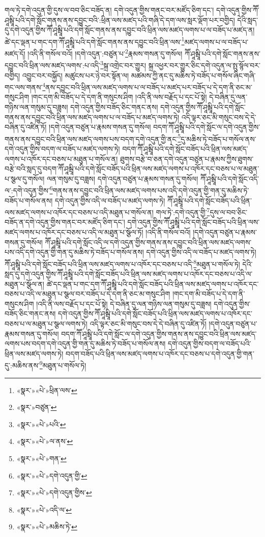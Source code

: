 གལ་ཏེ་དགེ་འདུན་གྱི་དུས་ལ་བབ་ཅིང་བཟོད་ན། དགེ་འདུན་གྱིས་གནང་བར་མཛོད་ཅིག་དང་། དགེ་འདུན་གྱིས་ཀཽ་ཤཱམྦཱི་པའི་དགེ་སློང་གནས་ནས་དབྱུང་བའི་:ཕྲིན་ལས་མཛད་པའི་གཞི་དེ་དག་ལས་སླར་ལྡོག་པར་བགྱིད། དེའི་སླད་དུ་དགེ་འདུན་གྱིས་ཀཽ་ཤཱམྦཱི་པའི་དགེ་སློང་གནས་ནས་དབྱུང་བའི་ཕྲིན་ལས་མཛད་ལགས་པ་ལ་བཟོད་པ་མཛད་ན། ཚེ་དང་ལྡན་པ་གང་དག་ཀཽ་ཤཱམྦཱི་པའི་དགེ་སློང་གནས་ནས་དབྱུང་བའི་ཕྲིན་ལས་\footnote{«སྣར་»«པེ་»ཕྲིན་ལས་}མཛད་ལགས་པ་ལ་བཟོད་པ་མཛད་དོ། །འདི་ནི་གསོལ་བའོ། །དགེ་འདུན་:བཙུན་པ་\footnote{«སྣར་»བཙུན་}རྣམས་གསན་དུ་གསོལ། ཀཽ་ཤཱམྦཱི་པའི་དགེ་སློང་གནས་ནས་དབྱུང་བའི་ཕྲིན་ལས་མཛད་ལགས་:པ་འདི་\footnote{«སྣར་»«པེ་»པའི་}སྐྲ་འགྲེང་བར་གྱུར། སྐྲ་འཕྱར་བར་གྱུར་ཅིང་དགེ་འདུན་ལ་སྤུ་སྙོལ་བར་བགྱིད། འབྱུང་བར་བསྐྱོད། མཚུངས་པར་ཉེ་བར་སྟོན་ལ། མཚམས་ཀྱི་ནང་དུ་མཆིས་ཏེ་བཟོད་པ་གསོལ་ཞིང་གཞི་གང་ལས་གནས་\footnote{«སྣར་»«པེ་»ལ་ནས་}ནས་དབྱུང་བའི་ཕྲིན་ལས་མཛད་ལགས་པ་ལ་བཟོད་པ་མཛད་པར་བཟོད་པ་དེ་དག་ནི་ཅང་མ་གསུང་ཤིག །གང་དག་མི་བཟོད་པ་དེ་དག་ནི་གསུངས་ཤིག །འདི་ནི་ལས་བརྗོད་པ་དང་པོ་སྟེ། དེ་བཞིན་དུ་ལན་གཉིས་ལན་གསུམ་དུ་བཟླས། དགེ་འདུན་གྱིས་བཟོད་ཅིང་གནང་ནས། དགེ་འདུན་གྱིས་ཀཽ་ཤཱམྦཱི་པའི་དགེ་སློང་གནས་ནས་དབྱུང་བའི་ཕྲིན་ལས་མཛད་ལགས་པ་ལ་བཟོད་པ་མཛད་ལགས་ཏེ། འདི་ལྟར་ཅང་མི་གསུང་བས་དེ་དེ་བཞིན་དུ་འཛིན་ཏོ། །དགེ་འདུན་བཙུན་པ་རྣམས་གསན་དུ་གསོལ། བདག་ཀཽ་ཤཱམྦཱི་པའི་དགེ་སློང་ལ་དགེ་འདུན་གྱིས་གནས་ནས་དབྱུང་བའི་ཕྲིན་ལས་མཛད་ལགས་པས་བདག་དགེ་འདུན་གྱི་ནང་\footnote{«སྣར་»«པེ་»གན་}དུ་མཆིས་ཏེ་བཟོད་པ་གསོལ་ནས་དགེ་འདུན་གྱིས་བདག་ལ་བཟོད་པ་མཛད་ལགས་ཏེ། བདག་ཀཽ་ཤཱམྦཱི་པའི་དགེ་སློང་བཟོད་པའི་ཕྲིན་ལས་མཛད་ལགས་པ་འཁོར་དང་བཅས་པ་མཐུན་པ་གསོལ་ན། ཐུགས་བརྩེ་བ་ཅན་དགེ་འདུན་བཙུན་པ་རྣམས་ཀྱིས་ཐུགས་བརྩེ་བའི་སླད་དུ་བདག་ཀཽ་ཤཱམྦཱི་པའི་དགེ་སློང་བཟོད་པའི་ཕྲིན་ལས་མཛད་ལགས་པ་འཁོར་དང་བཅས་པ་ལ་མཐུན་པ་སྩལ་དུ་གསོལ། ལན་གསུམ་དུ་བཟླས། དགེ་འདུན་བཙུན་པ་རྣམས་གསན་དུ་གསོལ། ཀཽ་ཤཱམྦཱི་པའི་དགེ་སློང་འདི་ལ་:དགེ་འདུན་གྱིས་\footnote{«སྣར་»«པེ་»དགེ་འདུན་གྱི་}གནས་ནས་དབྱུང་བའི་ཕྲིན་ལས་མཛད་ལགས་པས་འདི་དགེ་འདུན་གྱི་གན་དུ་མཆིས་ཏེ་བཟོད་པ་གསོལ་ནས། དགེ་འདུན་གྱིས་འདི་ལ་བཟོད་པ་མཛད་ལགས་ཏེ། ཀཽ་ཤཱམྦཱི་པའི་དགེ་སློང་བཟོད་པའི་ཕྲིན་ལས་མཛད་ལགས་པ་འཁོར་དང་བཅས་པ་འདི་མཐུན་པ་གསོལ་ན། གལ་ཏེ་:དགེ་འདུན་གྱི་\footnote{«སྣར་»«པེ་»དགེ་འདུན་གྱིས་}དུས་ལ་བབ་ཅིང་བཟོད་ན་དགེ་འདུན་གྱིས་གནང་བར་མཛོད་ཅིག་དང་། དགེ་འདུན་གྱིས་ཀཽ་ཤཱམྦཱི་པའི་དགེ་སློང་བཟོད་པའི་ཕྲིན་ལས་མཛད་ལགས་པ་འཁོར་དང་བཅས་པ་འདི་ལ་མཐུན་པ་སྩོལ་ཏོ། །འདི་ནི་གསོལ་བའོ། །དགེ་འདུན་བཙུན་པ་རྣམས་གསན་དུ་གསོལ། ཀཽ་ཤཱམྦཱི་པའི་དགེ་སློང་འདི་ལ་དགེ་འདུན་གྱིས་གནས་ནས་དབྱུང་བའི་ཕྲིན་ལས་མཛད་ལགས་པས་འདི་དགེ་འདུན་གྱི་གན་དུ་མཆིས་ཏེ་བཟོད་པ་གསོལ་ནས། དགེ་འདུན་གྱིས་འདི་ལ་བཟོད་པ་མཛད་ལགས་ཏེ། ཀཽ་ཤཱམྦཱི་པའི་དགེ་སློང་བཟོད་པའི་ཕྲིན་ལས་མཛད་ལགས་པ་འཁོར་དང་བཅས་པ་འདི་\footnote{«སྣར་»«པེ་»འདི་ལ་}མཐུན་པ་གསོལ་ཏེ། དེའི་སླད་དུ་དགེ་འདུན་གྱིས་ཀཽ་ཤཱམྦཱི་པའི་དགེ་སློང་བཟོད་པའི་ཕྲིན་ལས་མཛད་ལགས་པ་འཁོར་དང་བཅས་པ་འདི་ལ་མཐུན་པ་སྩོལ་ན། ཚེ་དང་ལྡན་པ་གང་དག་ཀཽ་ཤཱམྦཱི་པའི་དགེ་སློང་བཟོད་པའི་ཕྲིན་ལས་མཛད་ལགས་པ་འཁོར་དང་བཅས་པ་འདི་ལ་མཐུན་པ་སྩལ་བར་བཟོད་པ་དེ་དག་ནི་ཅང་མ་གསུང་ཤིག །གང་དག་མི་བཟོད་པ་དེ་དག་ནི་གསུངས་ཤིག །འདི་ནི་ལས་བརྗོད་པ་དང་པོ་སྟེ། དེ་བཞིན་དུ་ལན་གཉིས་ལན་གསུམ་དུ་བཟླས། དགེ་འདུན་གྱིས་བཟོད་ཅིང་གནང་ནས། དགེ་འདུན་གྱིས་ཀཽ་ཤཱམྦཱི་པའི་དགེ་སློང་བཟོད་པའི་ཕྲིན་ལས་མཛད་ལགས་པ་འཁོར་དང་བཅས་པ་ལ་མཐུན་པ་སྩལ་ལགས་ཏེ། འདི་ལྟར་ཅང་མི་གསུང་བས་དེ་དེ་བཞིན་དུ་འཛིན་ཏོ། །དགེ་འདུན་བཙུན་པ་རྣམས་གསན་དུ་གསོལ། བདག་ཀཽ་ཤཱམྦཱི་པའི་དགེ་སློང་ལ་དགེ་འདུན་གྱིས་གནས་ནས་དབྱུང་བའི་ཕྲིན་ལས་མཛད་ལགས་པས་བདག་དགེ་འདུན་གྱི་གན་དུ་མཆིས་ཏེ་བཟོད་པ་གསོལ་ནས། དགེ་འདུན་གྱིས་བདག་ལ་བཟོད་པའི་ཕྲིན་ལས་མཛད་ལགས་ཏེ། བདག་བཟོད་པའི་ཕྲིན་ལས་མཛད་ལགས་པ་འཁོར་དང་བཅས་པ་དགེ་འདུན་གྱི་གན་དུ་:མཆིས་ནས་\footnote{«སྣར་»«པེ་»མཆིས་ཏེ་}མཐུན་པ་གསོལ་ཏེ། 